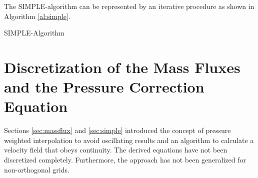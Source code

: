 The SIMPLE-algorithm can be represented by an iterative procedure as shown in Algorithm \ref{al:simple}.
\begin{algorithm}
\label{al:simple}
\caption{SIMPLE-Algorithm}
\begin{algorithmic}
  \EndIf
\EndWhile
{}
  \EndIf
\end{algorithmic}
\end{algorithm}

\section{Discretization of the Mass Fluxes and the Pressure Correction Equation}
\label{sec:segpresscorr}

Sections \ref{sec:massflux} and \ref{sec:simple} introduced the concept of pressure weighted interpolation to avoid oscillating results and an algorithm to calculate a velocity field that obeys continuity. The derived equations have not been discretized completely. Furthermore, the approach has not been generalized for non-orthogonal grids.

